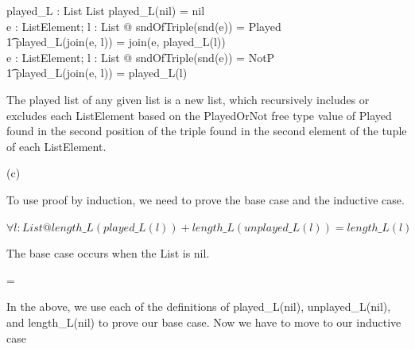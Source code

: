 \documentclass[a4paper,10pt,fleqn]{article}
\begin{document}
\bigskip

\begin{axdef}
played\_L : List \fun List
\where
played\_L(nil) = nil \\
\forall e : ListElement; l : List @ sndOfTriple(snd(e)) = Played \implies \\
\t1 played\_L(join(e, l)) = join(e, played\_L(l)) \\
\forall e : ListElement; l : List @ sndOfTriple(snd(e)) = NotP \implies \\
\t1 played\_L(join(e, l)) = played\_L(l)
\end{axdef}

\noindent The played list of any given list is a new list, which recursively includes or excludes each ListElement based on the PlayedOrNot free type value of Played found in the second position of the triple found in the second element of the tuple of each ListElement. 

\bigskip

\setlength{\leftskip}{0pt}
\medskip

\noindent\hspace*{\parindent}(c)

\setlength{\leftskip}{\dimexpr\parindent+2em\relax}
\noindent To use proof by induction, we need to prove the base case and the inductive case. 

\bigskip


\bigskip

\setlength{\leftskip}{\dimexpr\parindent+2em\relax}
\noindent
$\forall l : List @ length\_L(played\_L(l)) + length\_L(unplayed\_L(l)) = length\_L(l)$


\noindent The base case occurs when the List is nil.

\bigskip

\savedleftskip=\leftskip
\noindent
{}
\bigskip

\noindent In the above, we use each of the definitions of played\_L(nil), unplayed\_L(nil), and length\_L(nil) to prove our base case.  Now we have to move to our inductive case 
\end{document}

